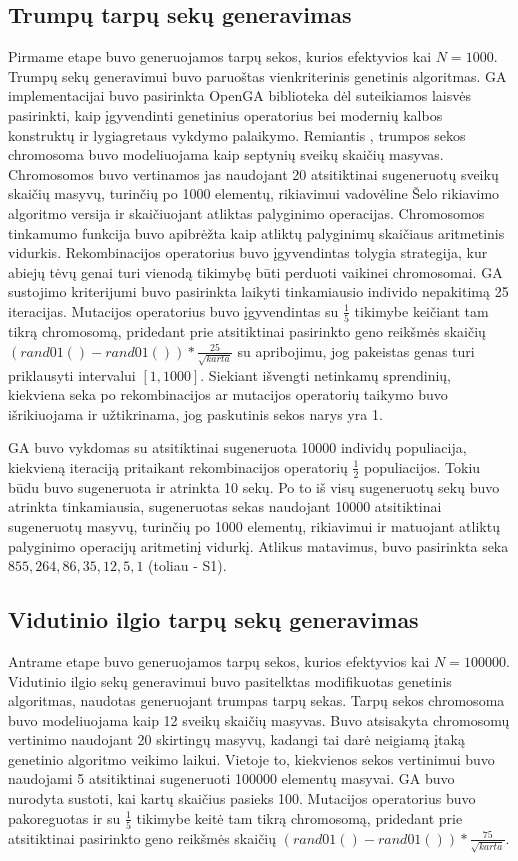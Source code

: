 \documentclass{VUMIFInfKursinis}
\begin{document}
\subsection{Trumpų tarpų sekų generavimas}
Pirmame etape buvo generuojamos tarpų sekos, kurios efektyvios kai $N=1000$.
Trumpų sekų generavimui buvo paruoštas vienkriterinis genetinis algoritmas.
GA implementacijai buvo pasirinkta OpenGA biblioteka \cite{mohammadi2017openga}
dėl suteikiamos laisvės pasirinkti, kaip įgyvendinti genetinius operatorius bei modernių kalbos konstruktų ir lygiagretaus vykdymo palaikymo.
Remiantis \cite{simpson1999faster}, trumpos sekos chromosoma buvo modeliuojama kaip
septynių sveikų skaičių masyvas.
Chromosomos buvo vertinamos jas naudojant 20 atsitiktinai
sugeneruotų sveikų skaičių masyvų, turinčių po 1000 elementų, rikiavimui vadovėline Šelo rikiavimo algoritmo versija ir skaičiuojant atliktas palyginimo operacijas.
Chromosomos tinkamumo funkcija buvo apibrėžta kaip atliktų palyginimų skaičiaus aritmetinis vidurkis.
Rekombinacijos operatorius buvo įgyvendintas tolygia strategija, kur abiejų tėvų genai turi vienodą tikimybę
būti perduoti vaikinei chromosomai.
GA sustojimo kriterijumi buvo pasirinkta laikyti tinkamiausio individo nepakitimą 25 iteracijas.
Mutacijos operatorius buvo įgyvendintas su $\frac{1}{5}$ tikimybe keičiant tam tikrą chromosomą,
pridedant prie atsitiktinai pasirinkto geno reikšmės skaičių $(rand01()-rand01())*\frac{25}{\sqrt{karta}}$ su apribojimu, jog pakeistas genas turi priklausyti intervalui $[1, 1000]$.
Siekiant išvengti netinkamų sprendinių, kiekviena seka po rekombinacijos ar mutacijos operatorių taikymo buvo išrikiuojama ir
užtikrinama, jog paskutinis sekos narys yra 1.

GA buvo vykdomas su atsitiktinai sugeneruota 10000 individų populiacija, kiekvieną iteraciją pritaikant rekombinacijos operatorių
$\frac{1}{2}$ populiacijos.
Tokiu būdu buvo sugeneruota ir atrinkta 10 sekų.
Po to iš visų sugeneruotų sekų buvo atrinkta tinkamiausia, sugeneruotas sekas naudojant 10000 atsitiktinai sugeneruotų masyvų, turinčių po 1000 elementų, rikiavimui
ir matuojant atliktų palyginimo operacijų aritmetinį vidurkį.
Atlikus matavimus, buvo pasirinkta seka $855, 264, 86, 35, 12, 5, 1$ (toliau - S1).

\subsection{Vidutinio ilgio tarpų sekų generavimas}
Antrame etape buvo generuojamos tarpų sekos, kurios efektyvios kai $N=100000$.
Vidutinio ilgio sekų generavimui buvo pasitelktas modifikuotas genetinis algoritmas, naudotas generuojant trumpas tarpų sekas.
Tarpų sekos chromosoma buvo modeliuojama kaip 12 sveikų skaičių masyvas.
Buvo atsisakyta chromosomų vertinimo naudojant 20 skirtingų masyvų, kadangi tai darė neigiamą įtaką genetinio algoritmo veikimo laikui.
Vietoje to, kiekvienos sekos vertinimui buvo naudojami 5 atsitiktinai sugeneruoti 100000 elementų masyvai.
GA buvo nurodyta sustoti, kai kartų skaičius pasieks 100.
Mutacijos operatorius buvo pakoreguotas ir su $\frac{1}{5}$ tikimybe keitė tam tikrą chromosomą,
pridedant prie atsitiktinai pasirinkto geno reikšmės skaičių $(rand01()-rand01())*\frac{75}{\sqrt{karta}}$.
\end{document}
